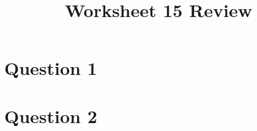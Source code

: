 \documentclass[12pt]{article}
\begin{document}
\title{Worksheet 15 Review}
\maketitle

\section*{Question 1}

\section*{Question 2}
\end{document}
